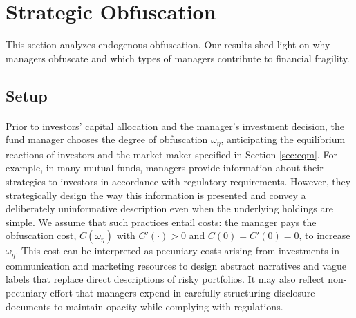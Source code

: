 \section{Strategic Obfuscation}\label{sec:endogenousopacity}
This section analyzes endogenous obfuscation. Our results shed light on why managers obfuscate and which types of managers contribute to financial fragility.

\subsection{Setup} \label{sec:setupEndog}
\paragraph{}
Prior to investors' capital allocation and the manager's investment decision, the fund manager chooses the degree of obfuscation $\omega_{\eta}$, anticipating the equilibrium reactions of investors and the market maker specified in Section \ref{sec:eqm}. For example, in many mutual funds, managers provide information about their strategies to investors in accordance with regulatory requirements. However, they strategically design the way this information is presented and convey a deliberately uninformative description even when the underlying holdings are simple.
We assume that such practices entail costs: the manager pays the obfuscation cost, $C(\omega_{\eta})$ with $C'(\cdot)>0$ and $C(0)=C'(0)=0$, to increase $\omega_{\eta}$. This cost can be interpreted as pecuniary costs arising from investments in communication and marketing resources to design abstract narratives and vague labels that replace direct descriptions of risky portfolios. It may also reflect non-pecuniary effort that managers expend in carefully structuring disclosure documents to maintain opacity while complying with regulations.

